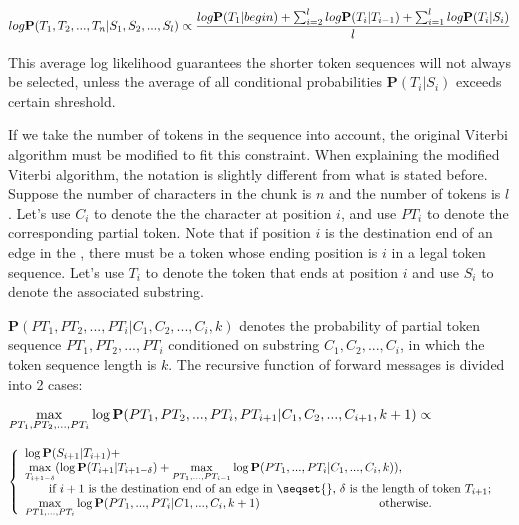 \begin{equation}
log \mathbf{P}(T_1, T_2, ..., T_n|S_1, S_2, ..., S_l) \\
\propto \frac{log \mathbf{P}(T_1|begin) +
\sum_{i=2}^{l}log \mathbf{P}(T_i|T_{i-1}) + \sum_{i=1}^{l}log
\mathbf{P}(T_i|S_i)}{l}
\end{equation}

This average log likelihood guarantees the shorter token sequences
will not always be selected, unless the average of all conditional
probabilities $\mathbf{P}(T_i|S_i)$ exceeds certain shreshold.

If we take the number of tokens in the sequence into account, the original
Viterbi algorithm must be modified to fit this constraint. When
explaining the modified Viterbi algorithm, the notation is slightly
different from what is stated before. Suppose the number of characters
in the chunk is $n$ and the number of tokens is $l$. Let's use $C_i$
to denote the the character at
position $i$, and use $PT_i$ to denote the corresponding partial
token. Note that if position $i$ is the destination end of an edge in
the \seqset{}, there must be a token whose ending position is
$i$ in a legal token sequence. Let's use $T_i$ to denote the token
that ends at position $i$ and
use $S_i$ to denote the associated substring. 

$\mathbf{P}(PT_1, PT_2, ..., PT_i|C_1, C_2, ..., C_i, k)$ denotes the
probability of partial token sequence $PT_1, PT_2, ..., PT_i$
conditioned on substring $C_1, C_2, ..., C_i$, in which the token
sequence length is $k$. The recursive function of forward messages is
divided into 2 cases:

$\\ \displaystyle{\max_{PT_1, PT_2, ..., PT_i}}\log\mathbf{P}(PT_1, PT_2, ..., PT_i,
PT_{i+1}|C_1, C_2, ..., C_{i+1}, k+1) \propto$

$\left\{
  \begin{array}{ll}
    \log \mathbf{P}(S_{i+1}|T_{i+1}) + \\
\displaystyle{\max_{T_{i+1-\delta}}}(\log\mathbf{P}(T_{i+1}|T_{i+1-\delta})
+ \displaystyle{\max_{PT_1, ...,
  PT_{i-1}}}\log\mathbf{P}(PT_1, ..., PT_i|C_1, ..., C_i, k)), 
& \\ \qquad
  \hbox{if $i+1$ is the destination end of an edge in \seqset{},
  $\delta$ is the length of token $T_{i+1}$;} \\
    \displaystyle{\max_{PT1, ..., PT_i}}\log\mathbf{P}(PT_1, ..., PT_i|C1, ...,
  C_i, k+1)
\qquad \qquad \qquad \qquad \qquad \hbox{otherwise.}
  \end{array}
\right. $

